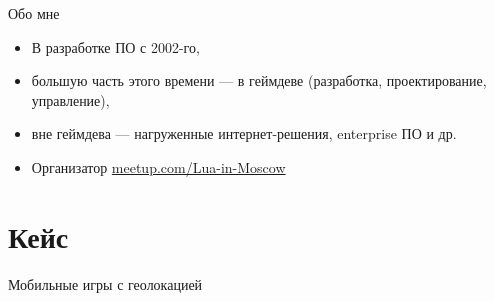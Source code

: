 \documentclass[aspectratio=169,handout,bigger]{beamer}
\begin{document}
\begin{frame}{Обо мне}

\begin{itemize}
\item В разработке ПО с 2002-го,
\item большую часть этого времени --- в геймдеве (разработка, проектирование, управление),
\item вне геймдева --- нагруженные интернет-решения, enterprise ПО и др.
\item Организатор \href{http://meetup.com/Lua-in-Moscow}{meetup.com/Lua-in-Moscow}
\end{itemize}

\end{frame}


\section{Кейс}


\begin{frame}{Мобильные игры с геолокацией}
\end{frame}
\end{document}
